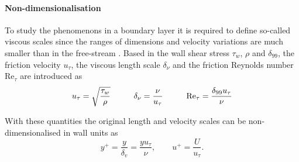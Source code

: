 


\paragraph{Non-dimensionalisation}
To study the phenomenons in a boundary layer it is required to define so-called viscous scales since the ranges of dimensions and velocity variations are much smaller than in the free-stream \citep{pope_turbulent_2015}.
Based in the wall shear stress $\tau_w$, $\rho$ and $\delta_{99}$, the friction velocity $u_{\tau}$, the viscous length scale $\delta_{\nu}$ and the friction Reynolds number $\mathrm{Re}_{\tau}$ are introduced as
\begin{gather}
    u_{\tau} = \sqrt{\frac{\tau_w}{\rho}} \hspace{1.0cm}
    \delta_{\nu} = \frac{\nu}{u_{\tau}} \hspace{1.0cm}
    \mathrm{Re}_{\tau} = \frac{\delta_{99} u_\tau}{\nu}
\end{gather}

With these quantities the original length and velocity scales can be non-dimensionalised in wall units as \citep{moin_fundamentals_2024}
\begin{equation}
    y^+ = \frac{y}{\delta_v} = \frac{y u_\tau}{\nu}, \qquad
    u^+ = \frac{U}{u_\tau}.
\end{equation}

